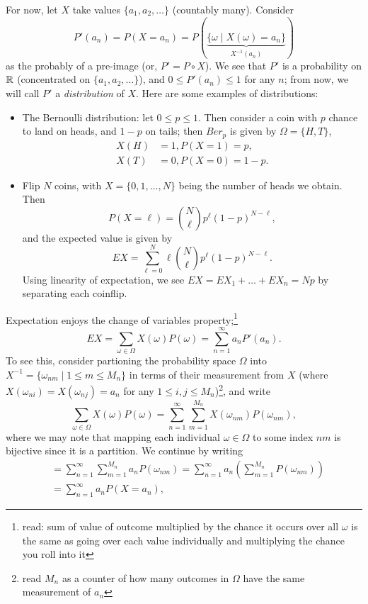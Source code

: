 \noindent For now, let $X$ take values $\{a_1, a_2, \dots\}$ (countably many). Consider
\[ P'(a_n) = P(X = a_n) = P(\underbrace{\{\omega \mid X(\omega) = a_n\}}_{X^{-1}(a_n)}) \]
as the probably of a pre-image (or, $P' = P \circ X$). We see that $P'$ is a probability on $\mathbb R$ (concentrated on $\{a_1, a_2, \dots\}$), and $0 \leq P'(a_n) \leq 1$ for any $n$; from now, we will call $P'$ a \textit{distribution} of $X$. Here are some examples of distributions:
\begin{itemize}
    \item The Bernoulli distribution: let $0 \leq p \leq 1$. Then consider a coin with $p$ chance to land on heads, and $1-p$ on tails; then $Ber_p$ is given by $\Omega = \{H, T\}$,
    \begin{align*}
        X(H) &= 1, P(X = 1) = p, \\
        X(T) &= 0, P(X = 0) = 1-p.
    \end{align*}
    \item Flip $N$ coins, with $X = \{0, 1, \dots, N\}$ being the number of heads we obtain. Then
    \[ P(X = \ell) = \binom{N}{\ell} p^\ell (1 - p)^{N - \ell}, \]
    and the expected value is given by
    \[ EX = \sum_{\ell = 0}^N \ell \binom{N}{\ell} p^\ell (1 - p)^{N - \ell}. \]
    Using linearity of expectation, we see $EX = EX_1 + \dots + EX_n = Np$ by separating each coinflip.
\end{itemize}
Expectation enjoys the change of variables property;\footnote{read: sum of value of outcome multiplied by the chance it occurs over all $\omega$ is the same as going over each value individually and multiplying the chance you roll into it}
\[ EX = \sum_{\omega \in \Omega} X(\omega) P(\omega) = \sum_{n=1}^\infty a_n P'(a_n). \]
To see this, consider partioning the probability space $\Omega$ into $X^{-1} = \{\omega_{nm} \mid 1 \leq m \leq M_n\}$ in terms of their measurement from $X$ (where $X(\omega_{ni}) = X(\omega_{nj}) = a_n$ for any $1 \leq i, j \leq M_n$)\footnote{read $M_n$ as a counter of how many outcomes in $\Omega$ have the same measurement of $a_n$}, and write
\[ \sum_{\omega \in \Omega} X(\omega) P(\omega) = \sum_{n=1}^\infty \sum_{m=1}^{M_n} X(\omega_{nm}) P(\omega_{nm}) \tag{by Lemma}, \]
where we may note that mapping each individual $\omega \in \Omega$ to some index $nm$ is bijective since it is a partition. We continue by writing
\begin{align*}
    &= \sum_{n=1}^\infty \sum_{m=1}^{M_n} a_n P(\omega_{nm}) = \sum_{n=1}^\infty a_n \left(\sum_{m=1}^{M_n}  P(\omega_{nm})\right) \\
    &= \sum_{n=1}^\infty a_n P(X = a_n),
\end{align*}
